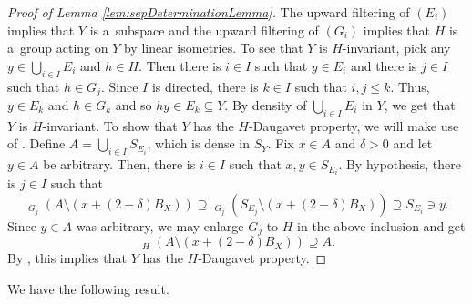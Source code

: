 \documentclass[a4paper,12pt]{amsart}
\theoremstyle{definition}
\theoremstyle{definition}
\theoremstyle{remark}
\numberwithin{equation}{section}
\newcommand{\clco}{\mathop{\overline{\mathrm{co}}}\nolimits}
\renewcommand{\leq}{\leqslant}
\newcommand{\<}{\langle}
\renewcommand{\>}{\rangle}
\begin{document}
	
	\begin{proof}[Proof of Lemma \ref{lem:sepDeterminationLemma}]
		The upward filtering of $(E_i)$ implies that $Y$ is a~subspace and the upward filtering of $(G_i)$ implies that $H$ is a~group acting on $Y$ by linear isometries. To see that $Y$ is $H$-invariant, pick any $y \in \bigcup_{i \in I} E_i$ and $h \in H$. Then there is $i \in I$ such that $y \in E_i$ and there is $j \in I$ such that $h \in G_j$. Since $I$ is directed, there is $k \in I$ such that $i, j \leq k$. Thus, $y \in E_k$ and $h \in G_k$ and so $hy \in E_k \subseteq Y$. By density of $\bigcup_{i \in I} E_i$ in $Y$, we get that $Y$ is $H$-invariant. To show that $Y$ has the $H$-Daugavet property, we will make use of .
		Define $A = \bigcup_{i \in I} S_{E_i}$, which is dense in $S_Y$. Fix $x \in A$ and $\delta > 0$ and let $y \in A$ be arbitrary.
		Then, there is $i \in I$ such that $x, y \in S_{E_i}$. By hypothesis, there is $j \in I$ such that
		\begin{equation*}
			\clco_{G_j}(A \setminus (x + (2 - \delta) B_X))
			\supseteq \clco_{G_j}(S_{E_j} \setminus (x + (2 - \delta) B_X))
			\supseteq S_{E_i}
			\ni y.
		\end{equation*}
		Since $y \in A$ was arbitrary, we may enlarge $G_j$ to $H$ in the above inclusion and get
		\begin{equation*}
			\clco_{H}(A \setminus (x + (2 - \delta) B_X)) \supseteq A.
		\end{equation*}
		By , this implies that $Y$ has the $H$-Daugavet property.
	\end{proof}
	
	We have the following result. 
	
\end{document}
